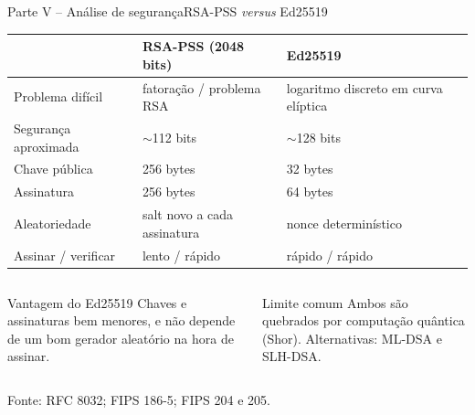 \documentclass[10pt,aspectratio=169]{beamer}
\newcommand{\source}[1]{\vfill{\tiny\color{gray}Fonte: #1}}
\begin{document}
\begin{frame}{Parte V -- Análise de segurança}{RSA-PSS \textit{versus} Ed25519}
  \centering\small
  \begin{tabular}{lll}
    \toprule
    & \textbf{RSA-PSS (2048 bits)} & \textbf{Ed25519} \\
    \midrule
    Problema difícil & fatoração / problema RSA & logaritmo discreto em curva elíptica \\
    Segurança aproximada & $\sim$112 bits & $\sim$128 bits \\
    Chave pública & 256 bytes & 32 bytes \\
    Assinatura & 256 bytes & 64 bytes \\
    Aleatoriedade & salt novo a cada assinatura & nonce determinístico \\
    Assinar / verificar & lento / rápido & rápido / rápido \\
    \bottomrule
  \end{tabular}

  \vspace{10pt}
  \begin{columns}[T,onlytextwidth]
      \begin{block}{Vantagem do Ed25519}
        Chaves e assinaturas bem menores, e não depende de um bom gerador aleatório na hora de assinar.
      \end{block}
      \begin{alertblock}{Limite comum}
        Ambos são quebrados por computação quântica (Shor). Alternativas: ML-DSA e SLH-DSA.
      \end{alertblock}
  \end{columns}
  \source{RFC 8032; FIPS 186-5; FIPS 204 e 205.}
\end{frame}

\end{document}
